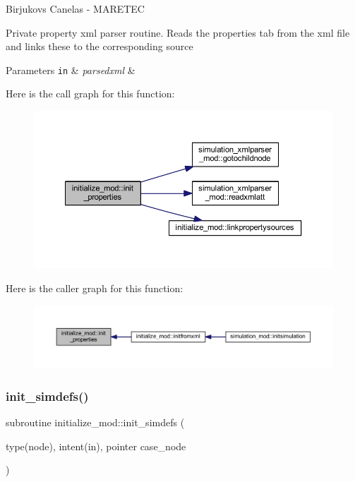 Birjukovs Canelas -\/ M\+A\+R\+E\+T\+EC 

Private property xml parser routine. Reads the properties tab from the xml file and links these to the corresponding source 
\begin{DoxyParams}[1]{Parameters}
\mbox{\tt in}  & {\em parsedxml} & \\
\hline
\end{DoxyParams}
Here is the call graph for this function\+:
\nopagebreak
\begin{figure}[H]
\begin{center}
\leavevmode
\includegraphics[width=350pt]{namespaceinitialize__mod_a4c7a93dca8bb7b573e91f877033ab22a_cgraph}
\end{center}
\end{figure}
Here is the caller graph for this function\+:
\nopagebreak
\begin{figure}[H]
\begin{center}
\leavevmode
\includegraphics[width=350pt]{namespaceinitialize__mod_a4c7a93dca8bb7b573e91f877033ab22a_icgraph}
\end{center}
\end{figure}
\mbox{\label{namespaceinitialize__mod_a18736cca205403067232125b8e510ab2}} 
\subsubsection{\texorpdfstring{init\+\_\+simdefs()}{init\_simdefs()}}
{\footnotesize\ttfamily subroutine initialize\+\_\+mod\+::init\+\_\+simdefs (\begin{DoxyParamCaption}\item[{type(node), intent(in), pointer}]{case\+\_\+node }\end{DoxyParamCaption})\hspace{0.3cm}{\ttfamily [private]}}



